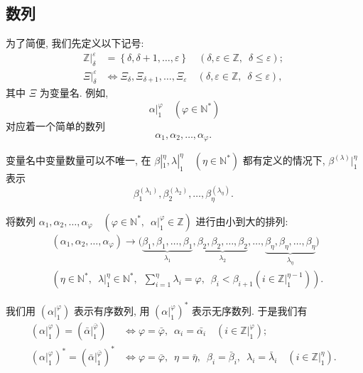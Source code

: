 \documentclass{article}
\renewcommand\.{.\hspace{3pt}}
\renewcommand\,{,\hspace{4pt}}
\renewcommand\:{:\hspace{3pt}}
\newcommand\A{,\hspace{6pt}}
\begin{document}
	\subsection{数列}
	
	为了简便\, 我们先定义以下记号\:
	\begin{align*}
		\mathbb{Z} |_{\delta}^{\varepsilon} & = \left\{ \delta , \delta+1 , \ldots , \varepsilon \right\} \quad \left( \delta , \varepsilon \in \mathbb{Z} \A \delta \leq \varepsilon \right) ; \\
		\Xi |_{\delta}^{\varepsilon} & \Longleftrightarrow \Xi_{\delta} , \Xi_{\delta+1} , \ldots , \Xi_{\varepsilon} \quad \left( \delta , \varepsilon \in \mathbb{Z} \A \delta \leq \varepsilon \right) \,
	\end{align*}
	其中 $\Xi$ 为变量名\. 例如\, $$\alpha |_{1}^{\varphi} \quad \left( \varphi \in \mathbb{N^{\ast}} \right)$$ 对应着一个简单的数列 $$\alpha_{1} , \alpha_{2} , \ldots , \alpha_{\varphi} \.$$
	
	变量名中变量数量可以不唯一\, 在 $\beta |_{1}^{\eta} , \lambda |_{1}^{\eta} \quad \left( \eta \in \mathbb{N^{\ast}} \right)$ 都有定义的情况下\, $\beta^{\left( \lambda \right)} |_{1}^{\eta}$ 表示 $$\beta_{1}^{\left( \lambda_{1} \right)} , \beta_{2}^{\left( \lambda_{2} \right)} , \ldots , \beta_{\eta}^{\left( \lambda_{\eta} \right)} \.$$
	
	将数列 $\alpha_{1} , \alpha_{2} , \ldots , \alpha_{\varphi} \quad \left( \varphi \in \mathbb{N^{\ast}} \A \alpha |_{1}^{\varphi} \in \mathbb{Z} \right) $ 进行由小到大的排列\:
	\begin{equation} \label{eqn:1}
		\begin{split}
		& \left( \alpha_{1} , \alpha_{2} , \ldots , \alpha_{\varphi} \right) \longrightarrow \big( \underbrace{\beta_{1} , \beta_{1} , \ldots , \beta_{1}}_{\lambda_{1}} , \underbrace{\beta_{2} , \beta_{2} , \ldots , \beta_{2}}_{\lambda_{2}} , \ldots , \underbrace{\beta_{\eta} , \beta_{\eta} , \ldots , \beta_{\eta}}_{\lambda_{\eta}} \big) \\
		& \left( \eta \in \mathbb{N^{\ast}} \A \lambda |_{1}^{\eta} \in \mathbb{N^{\ast}} \A \sum_{i=1}^{\eta} \lambda_{i} = \varphi \A \beta_{i} < \beta_{i+1} \left( i \in \mathbb{Z} |_{1}^{\eta-1} \right) \right) \.
		\end{split}
	\end{equation}
	
	我们用 $\left( \alpha |_{1}^{\varphi} \right)$ 表示有序数列\, 用 $\left( \alpha |_{1}^{\varphi} \right)^{\ast}$ 表示无序数列\. 于是我们有
	\begin{align*}
		\left( \alpha |_{1}^{\varphi} \right) = \left( \bar{\alpha} |_{1}^{\bar{\varphi}} \right) & \Leftrightarrow \varphi = \bar{\varphi} \A \alpha_{i} = \bar{\alpha_{i}} \quad \left( i \in \mathbb{Z} |_{1}^{\varphi} \right) ;\\
		\left( \alpha |_{1}^{\varphi} \right)^{\ast} = \left( \bar{\alpha} |_{1}^{\bar{\varphi}} \right)^{\ast} & \Leftrightarrow \varphi = \bar{\varphi} \A \eta = \bar{\eta} \A \beta_{i} = \bar{\beta}_{i} \A \lambda_{i} = \bar{\lambda}_{i} \quad \left( i \in \mathbb{Z} |_{1}^{\eta} \right) \.
	\end{align*}
	
\end{document}
